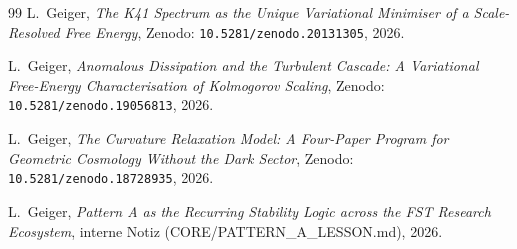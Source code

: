 \documentclass[11pt,a4paper]{article}
\theoremstyle{remark}
\begin{document}
\begin{thebibliography}{99}
L.~Geiger,
\emph{The K41 Spectrum as the Unique Variational Minimiser of a
Scale-Resolved Free Energy},
Zenodo: \texttt{10.5281/zenodo.20131305}, 2026.

L.~Geiger,
\emph{Anomalous Dissipation and the Turbulent Cascade: A Variational
Free-Energy Characterisation of Kolmogorov Scaling},
Zenodo: \texttt{10.5281/zenodo.19056813}, 2026.

L.~Geiger,
\emph{The Curvature Relaxation Model: A Four-Paper Program for
Geometric Cosmology Without the Dark Sector},
Zenodo: \texttt{10.5281/zenodo.18728935}, 2026.

L.~Geiger,
\emph{Pattern A as the Recurring Stability Logic across the FST
Research Ecosystem}, interne Notiz (CORE/PATTERN\_A\_LESSON.md),
2026.

\end{thebibliography}
\end{document}
